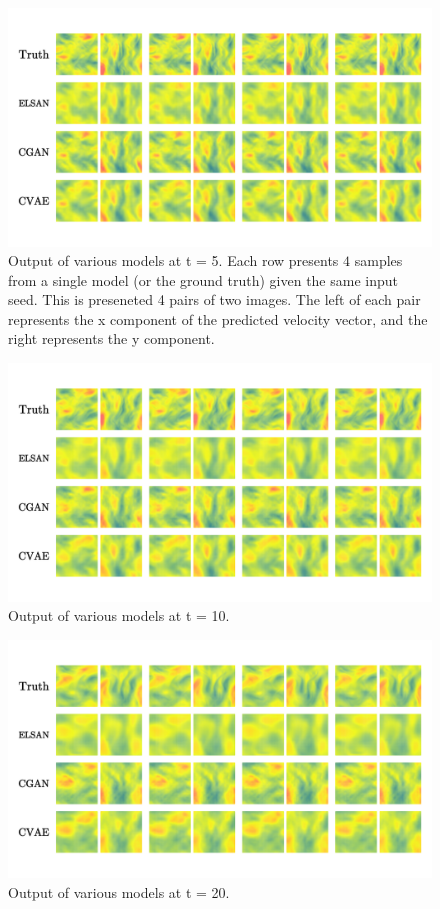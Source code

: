 \documentclass{article}
\begin{document}
\begin{figure}
    \centering
    \includegraphics[width=\textwidth]{t=5}
    \caption{Output of various models at t = 5. Each row presents $4$ samples from a single model (or the ground truth) given the same input seed. This is preseneted 4 pairs of two images. The left of each pair represents the x component of the predicted velocity vector, and the right represents the y component. }
    \label{t=5}
\end{figure}

\begin{figure}
    \centering
    \includegraphics[width=\textwidth]{t=10}
    \caption{Output of various models at t = 10.}
    \label{t=10}
\end{figure}

\begin{figure}
    \centering
    \includegraphics[width=\textwidth]{t=20}
    \caption{Output of various models at t = 20.}
    \label{t=20}
\end{figure}
\end{document}
